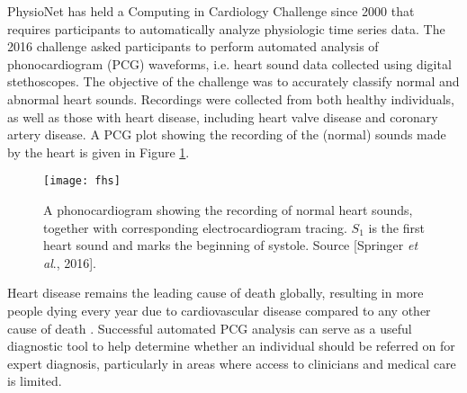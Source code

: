 \documentclass{article}
\begin{document}
PhysioNet \cite{PhysioNet} has held a Computing in Cardiology Challenge since 2000 that requires participants to automatically analyze physiologic time series data. The 2016 challenge \cite{clifford2016classification} asked participants to perform automated analysis of phonocardiogram (PCG) waveforms, i.e. heart sound data collected using digital stethoscopes. The objective of the challenge was to accurately classify normal and abnormal heart sounds. Recordings were collected from both healthy individuals, as well as those with heart disease, including heart valve disease and coronary artery disease. A PCG plot showing the recording of the (normal) sounds made by the heart is given in Figure \ref{fig:fhs}.

\begin{figure}[h]
\texttt{[image: fhs]}
\caption{A phonocardiogram showing the recording of normal heart sounds, together with corresponding electrocardiogram tracing. $S_1$ is the first heart sound and marks the beginning of systole. Source [Springer \emph{et al}., 2016].}
\label{fig:fhs}
\end{figure}

Heart disease remains the leading cause of death globally, resulting in more people dying every year due to  cardiovascular disease compared to any other cause of death \cite{web/who/cvd}. Successful automated PCG analysis can serve as a useful diagnostic tool to help determine whether an individual should be referred on for expert diagnosis, particularly in areas where access to clinicians and medical care is limited. 

\end{document}
